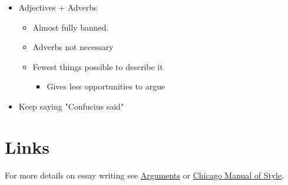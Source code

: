 \documentclass[letterpaper]{article}
\begin{document}
\begin{itemize}
\item Adjectives + Adverbs

\begin{itemize}
\item Almost fully banned.
\item Adverbs not necessary
\item Fewest things possible to describe it

\begin{itemize}
\item Gives less opportunities to argue
\end{itemize}
\end{itemize}

\item Keep saying "Confucius said"
\end{itemize}

\section{Links}
\label{sec:org0cef568}
For more details on essay writing see \href{Arguments\_51e1a4825d3e4acf81244196d2f27423.md.org}{Arguments} or \href{Chicago\_Manual\_of\_Style\_c75378bd8cde4c7ab7916ea5fcc56326.md.org}{Chicago Manual of Style}.
\end{document}
